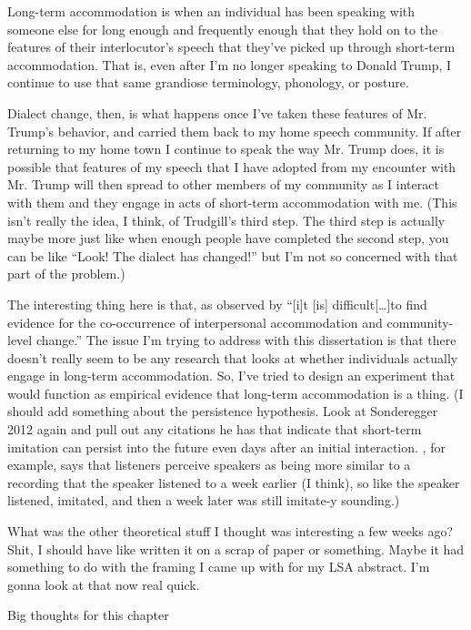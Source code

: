     Long-term accommodation is when an individual has been speaking with someone else for long enough and frequently enough that they hold on to the features of their interlocutor's speech that they've picked up through short-term accommodation. That is, even after I'm no longer speaking to Donald Trump, I continue to use that same grandiose terminology, phonology, or posture.

    Dialect change, then, is what happens once I've taken these features of Mr. Trump's behavior, and carried them back to my home speech community. If after returning to my home town I continue to speak the way Mr. Trump does, it is possible that features of my speech that I have adopted from my encounter with Mr. Trump will then spread to other members of my community as I interact with them and they engage in acts of short-term accommodation with me. (This isn't really the idea, I think, of Trudgill's third step. The third step is actually maybe more just like when enough people have completed the second step, you can be like ``Look! The dialect has changed!'' but I'm not so concerned with that part of the problem.)

    The interesting thing here is that, as observed by \citet{auer2005role} ``[i]t [is] difficult[\ldots{}]to find evidence for the co-occurrence of interpersonal accommodation and community-level change.'' The issue I'm trying to address with this dissertation is that there doesn't really seem to be any research that looks at whether individuals actually engage in long-term accommodation. So, I've tried to design an experiment that would function as empirical evidence that long-term accommodation is a thing. (I should add something about the persistence hypothesis. Look at Sonderegger 2012 again and pull out any citations he has that indicate that short-term imitation can persist into the future even days after an initial interaction. \cite{goldinger2000role}, for example, says that listeners perceive speakers as being more similar to a recording that the speaker listened to a week earlier (I think), so like the speaker listened, imitated, and then a week later was still imitate-y sounding.) 

    What was the other theoretical stuff I thought was interesting a few weeks ago? Shit, I should have like written it on a scrap of paper or something. Maybe it had something to do with the framing I came up with for my LSA abstract. I'm gonna look at that now real quick.

    Big thoughts for this chapter


